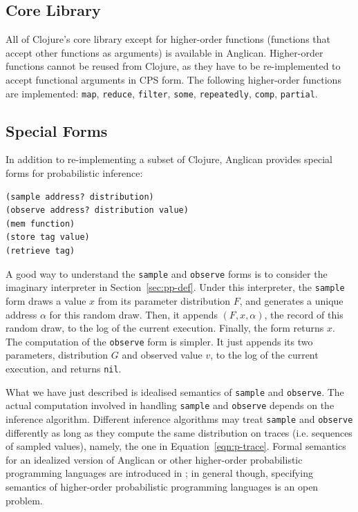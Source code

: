 \documentclass[preprint]{sigplanconf}
\begin{document}
\subsection{Core Library}
\label{sec:core}

All of Clojure's core library except for higher-order functions
(functions that accept other functions as arguments) is
available in Anglican. Higher-order functions cannot be reused
from Clojure, as they have to be re-implemented to accept
functional arguments in CPS form. The following higher-order
functions are implemented: \texttt{map}, \texttt{reduce},
\texttt{filter}, \texttt{some}, \texttt{repeatedly},
\texttt{comp}, \texttt{partial}.

\subsection{Special Forms}

 In addition to re-implementing a subset of Clojure, Anglican
provides special forms for probabilistic inference:
\begin{lstlisting}[style=default]
(sample address? distribution)
(observe address? distribution value)
(mem function)
(store tag value)
(retrieve tag)
\end{lstlisting}

A good way to understand the \texttt{sample} and \texttt{observe} forms
is to consider the imaginary interpreter in Section~\ref{sec:pp-def}.
Under this interpreter, the \texttt{sample} form draws a value $x$ from 
its parameter distribution $F$, and 
generates a unique address $\alpha$ for this random draw.
Then, it appends $(F, x, \alpha)$, the record of this random
draw, to the log of the current execution. Finally, the
form returns $x$. The computation of the \texttt{observe} form is
simpler. It just appends its two parameters, distribution $G$
and observed value $v$, to the log of the current execution,
and returns \texttt{nil}.

What we have just described is idealised semantics 
of \texttt{sample} and \texttt{observe}. The actual computation 
involved in handling \texttt{sample} and \texttt{observe} 
depends on the inference algorithm. Different inference algorithms may treat
\texttt{sample} and \texttt{observe} differently as long as they
compute the same distribution on traces (i.e. sequences of sampled values), 
namely, the one in Equation~\ref{eqn:p-trace}.
Formal semantics for an idealized version
of Anglican or other higher-order probabilistic programming languages are introduced 
in \cite{SYH+16,BorgstromLGS16}; in general though,
specifying semantics of higher-order probabilistic programming
languages is an open problem.
\end{document}
